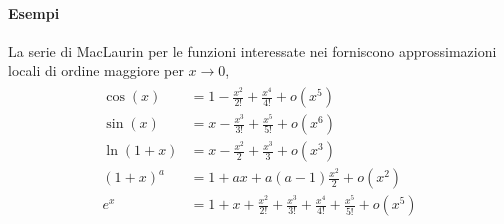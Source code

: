 \documentclass[letterpaper,10pt,italian]{jupyterBook}
\begin{document}
\paragraph{Esempi}
\label{\detokenize{ch/infinitesimal_calculus/derivatives:esempi}}
\sphinxAtStartPar
La serie di MacLaurin per le funzioni interessate nei {\hyperref[\detokenize{ch/infinitesimal_calculus/analysis:infinitesimal-calculus-limits-fund}]{}} forniscono approssimazioni locali di ordine maggiore per \(x \rightarrow 0\),
\begin{equation}\label{equation:ch/infinitesimal_calculus/derivatives:eq:infinitesimal-calculus:derivatives:taylor:fund-limits}
\begin{split}\begin{aligned}
 \cos(x) & = 1 - \frac{x^2}{2!} + \frac{x^4}{4!} + o(x^5) \\
 \sin(x) & = x - \frac{x^3}{3!} + \frac{x^5}{5!} + o(x^6) \\
 \ln (1+x) & = x - \frac{x^2}{2} + \frac{x^3}{3} + o(x^3) \\
 (1+x)^a & = 1 + a x + a(a-1) \frac{x^2}{2} + o(x^2) \\
 e^x     & = 1 + x + \frac{x^2}{2!} + \frac{x^3}{3!} + \frac{x^4}{4!} + \frac{x^5}{5!} + o(x^5)
\end{aligned}\end{split}
\end{equation}
\sphinxAtStartPar
{} 
\end{document}
